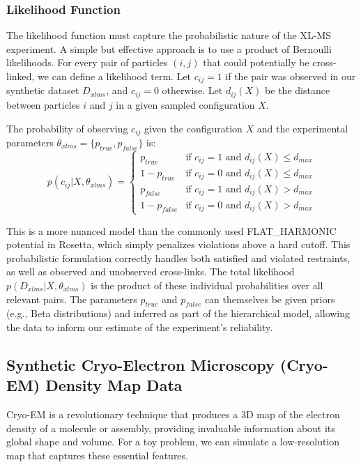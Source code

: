 \documentclass{article}
\begin{document}
\subsubsection{Likelihood Function}

The likelihood function must capture the probabilistic nature of the XL-MS experiment. A simple but effective approach is to use a product of Bernoulli likelihoods. For every pair of particles $(i, j)$ that could potentially be cross-linked, we can define a likelihood term. Let $c_{ij} = 1$ if the pair was observed in our synthetic dataset $D_{xlms}$, and $c_{ij} = 0$ otherwise. Let $d_{ij}(X)$ be the distance between particles $i$ and $j$ in a given sampled configuration $X$.

The probability of observing $c_{ij}$ given the configuration $X$ and the experimental parameters $\theta_{xlms} = \{p_{true}, p_{false}\}$ is:
\[ p(c_{ij} | X, \theta_{xlms}) = \begin{cases} p_{true} & \text{if } c_{ij}=1 \text{ and } d_{ij}(X) \leq d_{max} \\ 1 - p_{true} & \text{if } c_{ij}=0 \text{ and } d_{ij}(X) \leq d_{max} \\ p_{false} & \text{if } c_{ij}=1 \text{ and } d_{ij}(X) > d_{max} \\ 1 - p_{false} & \text{if } c_{ij}=0 \text{ and } d_{ij}(X) > d_{max} \end{cases} \]

This is a more nuanced model than the commonly used FLAT\_HARMONIC potential in Rosetta, which simply penalizes violations above a hard cutoff.\cite{ref26} This probabilistic formulation correctly handles both satisfied and violated restraints, as well as observed and unobserved cross-links. The total likelihood $p(D_{xlms} | X, \theta_{xlms})$ is the product of these individual probabilities over all relevant pairs. The parameters $p_{true}$ and $p_{false}$ can themselves be given priors (e.g., Beta distributions) and inferred as part of the hierarchical model, allowing the data to inform our estimate of the experiment's reliability.

\subsection{Synthetic Cryo-Electron Microscopy (Cryo-EM) Density Map Data}

Cryo-EM is a revolutionary technique that produces a 3D map of the electron density of a molecule or assembly, providing invaluable information about its global shape and volume.\cite{ref28} For a toy problem, we can simulate a low-resolution map that captures these essential features.
\end{document}
